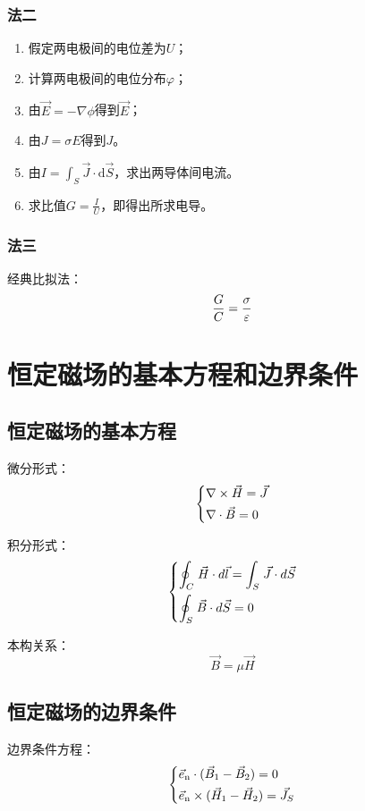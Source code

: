 \subsubsection*{法二}
\begin{enumerate}
	\item 假定两电极间的电位差为$U$；
	\item 计算两电极间的电位分布$\varphi$；
	\item 由$\vec{E} = -\nabla\phi$得到$\vec{E}$；
	\item 由$J = \sigma E$得到$J$。
	\item 由$I = \int_S \vec{J}\cdot\mathrm{d}\vec{S}$，求出两导体间电流。
	\item 求比值$G = \frac{I}{U}$，即得出所求电导。
\end{enumerate}

\subsubsection*{法三}
经典比拟法：
$${G \over C} = {\sigma  \over \varepsilon }$$

\section{恒定磁场的基本方程和边界条件}
\subsection*{恒定磁场的基本方程}
微分形式：
\[\left\{ \begin{gathered}
\nabla  \times \vec H = \vec J \hfill \\
\nabla  \cdot \vec B = 0 \hfill \\ 
\end{gathered}  \right.\]

积分形式：
\[\left\{ \begin{gathered}
\oint_C {{\kern 1pt} \vec H}  \cdot d\vec l = \int_S {{\kern 1pt} \vec J \cdot d\vec S}  \hfill \\
\oint_S {{\kern 1pt} \vec B}  \cdot d\vec S = 0 \hfill \\ 
\end{gathered}  \right.\]

本构关系：
\[\vec B = \mu \vec H\]

\subsection*{恒定磁场的边界条件}
边界条件方程：
\[\left\{ \begin{gathered}
{{\vec e}_{\text{n}}} \cdot ({{\vec B}_1} - {{\vec B}_2}) = 0 \hfill \\
{{\vec e}_{\text{n}}} \times ({{\vec H}_1} - {{\vec H}_2}) = {{\vec J}_S} \hfill \\ 
\end{gathered}  \right.\]

